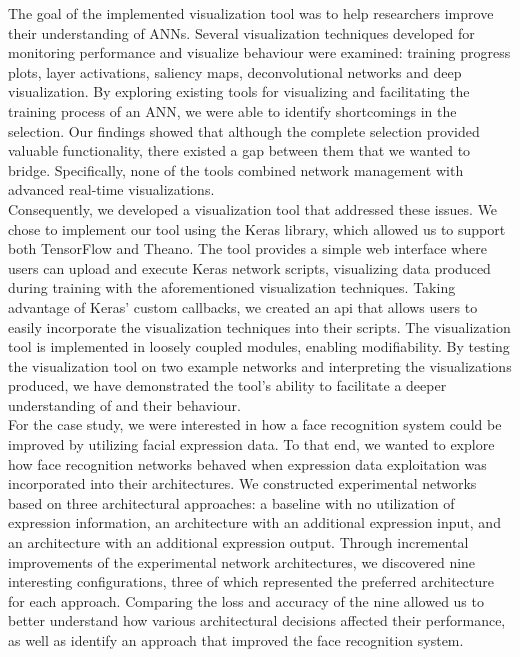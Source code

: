 The goal of the implemented visualization tool was to help researchers improve their understanding of ANNs. Several visualization techniques developed for monitoring performance and visualize behaviour were examined: training progress plots, layer activations, saliency maps, deconvolutional networks and deep visualization. By exploring existing tools for visualizing and facilitating the training process of an ANN, we were able to identify shortcomings in the selection. Our findings showed that although the complete selection provided valuable functionality, there existed a gap between them that we wanted to bridge. Specifically, none of the tools combined network management with advanced real-time visualizations. \\

\noindent Consequently, we developed a visualization tool that addressed these issues. We chose to implement our tool using the Keras library, which allowed us to support both TensorFlow and Theano. The tool provides a simple web interface where users can upload and execute Keras network scripts, visualizing data produced during training with the aforementioned visualization techniques. Taking advantage of Keras' custom callbacks, we created an \acrshort{api} that allows users to easily incorporate the visualization techniques into their scripts. The visualization tool is implemented in loosely coupled modules, enabling modifiability. By testing the visualization tool on two example networks and interpreting the visualizations produced, we have demonstrated the tool's ability to facilitate a deeper understanding of  and their behaviour. \\

\noindent For the case study, we were interested in how a face recognition system could be improved by utilizing facial expression data. To that end, we wanted to explore how face recognition networks behaved when expression data exploitation was incorporated into their architectures. We constructed experimental networks based on three architectural approaches: a baseline with no utilization of expression information, an architecture with an additional expression input, and an architecture with an additional expression output. Through incremental improvements of the experimental network architectures, we discovered nine interesting configurations, three of which represented the preferred architecture for each approach. Comparing the loss and accuracy of the nine allowed us to better understand how various architectural decisions affected their performance, as well as identify an approach that improved the face recognition system. \\


